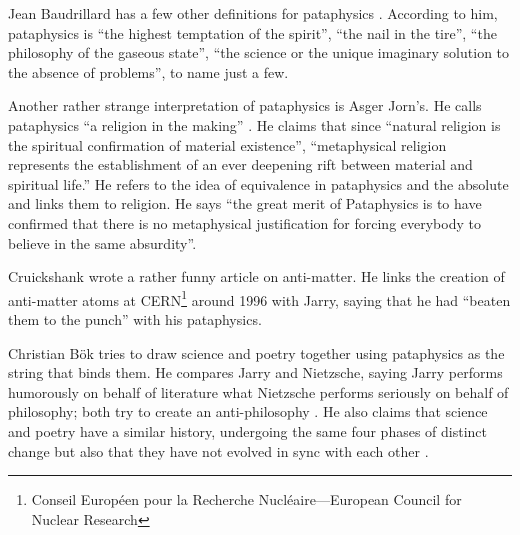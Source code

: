 Jean Baudrillard has a few other definitions for pataphysics \autocite*{Baudrillard2007}. According to him, pataphysics is ``the highest temptation of the spirit'', ``the nail in the tire'', ``the philosophy of the gaseous state'', ``the science or the unique imaginary solution to the absence of problems'', to name just a few.

Another rather strange interpretation of pataphysics is Asger Jorn's. He calls pataphysics ``a religion in the making'' \autocite*{Jorn1961}. He claims that since ``natural religion is the spiritual confirmation of material existence'', ``metaphysical religion represents the establishment of an ever deepening rift between material and spiritual life.'' He refers to the idea of equivalence in pataphysics and the absolute and links them to religion. He says ``the great merit of Pataphysics is to have confirmed that there is no metaphysical justification for forcing everybody to believe in the same absurdity''.

Cruickshank \autocite*{Cruickshank} wrote a rather funny article on anti-matter. He links the creation of anti-matter atoms at CERN\footnote{Conseil Européen pour la Recherche Nucléaire---European Council for Nuclear Research} around 1996 with Jarry, saying that he had ``beaten them to the punch'' with his pataphysics.

Christian Bök \autocite*{Bok2002} tries to draw science and poetry together using pataphysics as the string that binds them. He compares Jarry and Nietzsche, saying Jarry performs humorously on behalf of literature what Nietzsche performs seriously on behalf of philosophy; both try to create an anti-philosophy \autocite*{Bok2002}. He also claims that science and poetry have a similar history, undergoing the same four phases of distinct change but also that they have not evolved in sync with each other \autocite*{Bok2002}.


